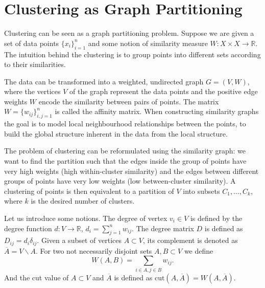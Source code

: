 \section{Clustering as Graph Partitioning}
\label{sec:ch2_clgrpart}
Clustering can be seen as a graph partitioning problem.
Suppose we are given a set of data points $\{x_i\}_{i=1}^n$ and some notion of similarity measure $W\colon X\times X\rightarrow \mathbb{R}$. 
The intuition behind the clustering is to group points into different sets according to their similarities. 

The data can be transformed into a weighted, undirected graph $G =(V,W)$, where the vertices $V$ of the graph represent the data points and the positive edge weights $W$ encode the similarity between pairs of points.
The matrix $W = \{w_{ij}\}_{i,j=1}^n$ is called the affinity matrix. When constructing similarity graphs the goal is to model local neighbourhood relationships between the points, to build the global structure inherent in the data 
from the local structure.

The problem of clustering can be reformulated using the similarity graph: we want to find the partition such that the edges inside the group of points have very high weights (high within-cluster similarity) and the edges between different groups of points 
have very low weights (low between-cluster similarity). A clustering of points is then equivalent to a partition of $V$ into subsets $C_1,\dots,C_k$, where $k$ is the desired number of clusters. 

Let us introduce some notions. The degree of vertex $v_i\in V$ is defined by the degree function $d\colon V\rightarrow \mathbb{R}$, $d_i = \sum_{j=1}^n w_{ij}$. The degree matrix $D$ is defined as $D_{ij} = d_i\delta_{ij}$. 
Given a subset of vertices $A\subset V$, its complement is denoted as $\overline{A} = V\backslash A$. For two not necessarily disjoint sets $A,B\subset V$ we define
\begin{equation*}
W(A,B) = \sum\limits_{i\in A, j\in B} w_{ij}.
\end{equation*}
And the cut value of $A\subset V$ and $\overline{A}$ is defined as 
$\mathrm{cut}(A,\overline{A}) = W(A,\overline{A})$. %

